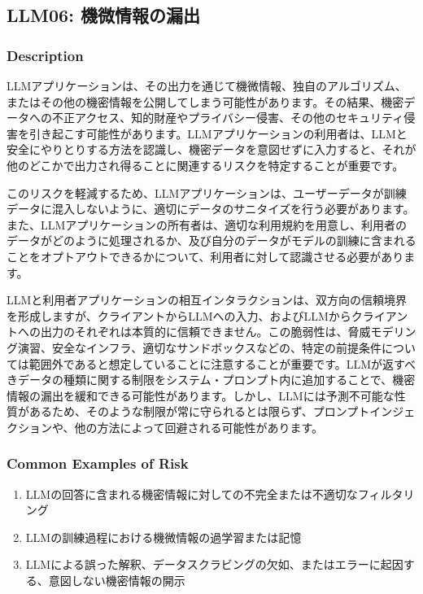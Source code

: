 \documentclass[
]{article}
\author{}
\date{}
\providecommand{\tightlist}{%
  \setlength{\itemsep}{0pt}\setlength{\parskip}{0pt}}
\begin{document}
\subsection{LLM06:
機微情報の漏出}\label{llm06-ux6a5fux5faeux60c5ux5831ux306eux6f0fux51fa}

\subsubsection{Description}\label{description}

LLMアプリケーションは、その出力を通じて機微情報、独自のアルゴリズム、またはその他の機密情報を公開してしまう可能性があります。その結果、機密データへの不正アクセス、知的財産やプライバシー侵害、その他のセキュリティ侵害を引き起こす可能性があります。LLMアプリケーションの利用者は、LLMと安全にやりとりする方法を認識し、機密データを意図せずに入力すると、それが他のどこかで出力され得ることに関連するリスクを特定することが重要です。

このリスクを軽減するため、LLMアプリケーションは、ユーザーデータが訓練データに混入しないように、適切にデータのサニタイズを行う必要があります。また、LLMアプリケーションの所有者は、適切な利用規約を用意し、利用者のデータがどのように処理されるか、及び自分のデータがモデルの訓練に含まれることをオプトアウトできるかについて、利用者に対して認識させる必要があります。

LLMと利用者アプリケーションの相互インタラクションは、双方向の信頼境界を形成しますが、クライアントからLLMへの入力、およびLLMからクライアントへの出力のそれぞれは本質的に信頼できません。この脆弱性は、脅威モデリング演習、安全なインフラ、適切なサンドボックスなどの、特定の前提条件については範囲外であると想定していることに注意することが重要です。LLMが返すべきデータの種類に関する制限をシステム・プロンプト内に追加することで、機密情報の漏出を緩和できる可能性があります。しかし、LLMには予測不可能な性質があるため、そのような制限が常に守られるとは限らず、プロンプトインジェクションや、他の方法によって回避される可能性があります。

\subsubsection{Common Examples of Risk}\label{common-examples-of-risk}

\begin{enumerate}
\def\labelenumi{\arabic{enumi}.}
\tightlist
\item
  LLMの回答に含まれる機密情報に対しての不完全または不適切なフィルタリング
\item
  LLMの訓練過程における機微情報の過学習または記憶
\item
  LLMによる誤った解釈、データスクラビングの欠如、またはエラーに起因する、意図しない機密情報の開示
\end{enumerate}
\end{document}
